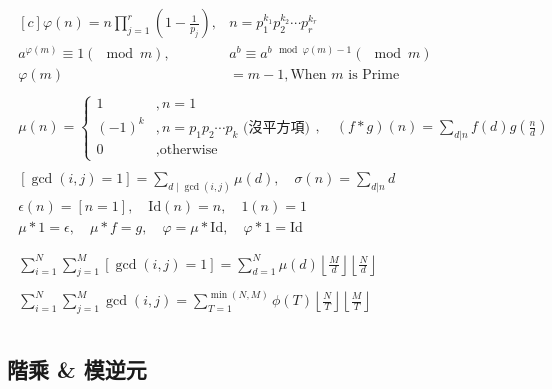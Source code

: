 \documentclass[a4paper,10pt,twocolumn,oneside]{article}
\newcommand{\inputcpp}[1]{}  %
\begin{document}
\begin{gather*}
  \begin{aligned}[c]
    \varphi(n)=n\prod_{j=1}^r \left(1-\frac{1}{p_j}\right), &  n=p_1^{k_1}p_2^{k_2}\cdots p_r^{k_r}\\
    a^{\varphi(m)}  \equiv 1 (\mod m), \quad &
    a^b \equiv a^{b \mod \varphi(m)-1} (\mod m)                                         \\
    \varphi(m)                               & = m - 1, \text{When } m \text{ is Prime}
  \end{aligned} \\
  \begin{aligned}
    \mu(n) = 
    \begin{cases} 
      1&, n = 1\\
      (-1)^k &,n = p_1p_2\cdots p_k \text{ (沒平方項)} \\ 
      0 & ,\text{otherwise}
      \end{cases}
    , \quad (f*g)(n)=\sum_{d|n}f(d)g\left(\frac{n}{d}\right)
  \end{aligned}  \\ 
  \begin{aligned}
    [\gcd(i, j) = 1] = \sum_{d \mid \gcd(i, j)} \mu(d), \quad \sigma(n)=\sum_{d|n}d  \\
    \epsilon(n) = [n=1], \quad \text{Id}(n)=n, \quad 1(n)=1 \\
    \mu*1=\epsilon, \quad \mu*f=g, \quad \varphi=\mu * \text{Id}, \quad \varphi*1=\text{Id} \\
  \end{aligned}  \\
  \begin{aligned}
    \sum_{i=1}^N\sum_{j=1}^M [\gcd(i,j)=1]
    =\sum_{d=1}^N \mu(d)\left\lfloor\frac{M}{d}\right\rfloor\left\lfloor\frac{N}{d}\right\rfloor
  \end{aligned}  \\
  \begin{aligned}
    \sum_{i=1}^N\sum_{j=1}^M \gcd(i,j)
    =\sum_{T=1}^{\min(N,M)} \phi(T) \left\lfloor \frac{N}{T} \right\rfloor \left\lfloor \frac{M}{T} \right\rfloor
  \end{aligned}  \\
\end{gather*}

\subsection{階乘 \& 模逆元}
\inputcpp{math/factorial_with_inverse.cpp}
\end{document}
